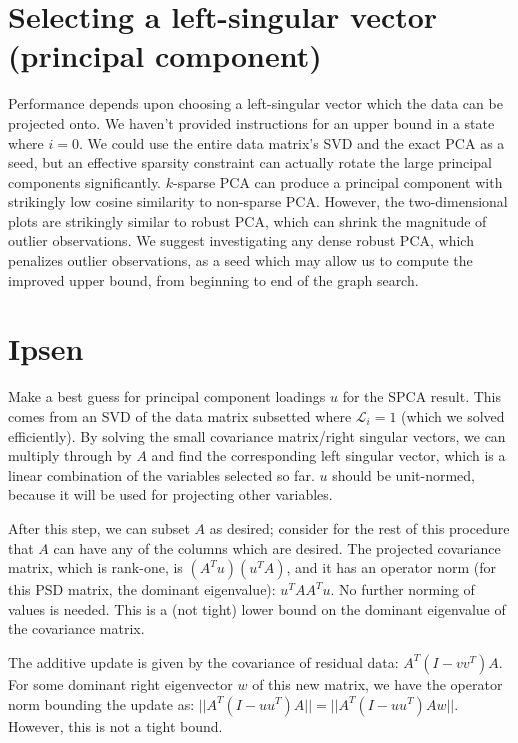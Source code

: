 \documentclass{article}
\begin{document}
\section{Selecting a left-singular vector (principal component)}

Performance depends upon choosing a left-singular vector which the data can be projected onto. We haven't provided instructions for an upper bound in a state where $i=0$. We could use the entire data matrix's SVD and the exact PCA as a seed, but an effective sparsity constraint can actually rotate the large principal components significantly. $k$-sparse PCA can produce a principal component with strikingly low cosine similarity to non-sparse PCA. However, the two-dimensional plots are strikingly similar to robust PCA, which can shrink the magnitude of outlier observations. We suggest investigating any dense robust PCA, which penalizes outlier observations, as a seed which may allow us to compute the improved upper bound, from beginning to end of the graph search.

\section{Ipsen}

Make a best guess for principal component loadings $u$ for the SPCA result. This comes from an SVD of the data matrix subsetted where $\mathcal{L}_i=1$ (which we solved efficiently). By solving the small covariance matrix/right singular vectors, we can multiply through by $A$ and find the corresponding left singular vector, which is a linear combination of the variables selected so far. $u$ should be unit-normed, because it will be used for projecting other variables.

After this step, we can subset $A$ as desired; consider for the rest of this procedure that $A$ can have any of the columns which are desired. The projected covariance matrix, which is rank-one, is $(A^T u)(u^T A)$, and it has an operator norm (for this PSD matrix, the dominant eigenvalue): $u^T A A^T u$. No further norming of values is needed. This is a (not tight) lower bound on the dominant eigenvalue of the covariance matrix.

The additive update is given by the covariance of residual data: $A^T (I - v v^T) A$. For some dominant right eigenvector $w$ of this new matrix, we have the operator norm bounding the update as: $||A^T (I-uu^T) A|| = ||A^T (I-uu^T) A w||$. However, this is not a tight bound.
\end{document}
